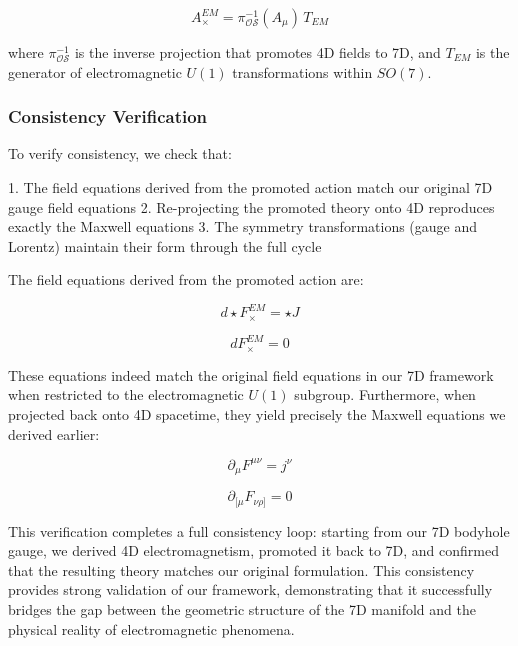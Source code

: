 \documentclass{article}
\begin{document}
\begin{equation}
A^{EM}_{\times} = \pi^{-1}_{\mathcal{OS}}(A_{\mu}) \, T_{EM}
\end{equation}

where $\pi^{-1}_{\mathcal{OS}}$ is the inverse projection that promotes 4D fields to 7D, and $T_{EM}$ is the generator of electromagnetic $U(1)$ transformations within $SO(7)$.

\subsubsection{Consistency Verification}

To verify consistency, we check that:

1. The field equations derived from the promoted action match our original 7D gauge field equations
2. Re-projecting the promoted theory onto 4D reproduces exactly the Maxwell equations
3. The symmetry transformations (gauge and Lorentz) maintain their form through the full cycle

The field equations derived from the promoted action are:

\begin{equation}
d \star F^{EM}_{\times} = \star J
\end{equation}

\begin{equation}
dF^{EM}_{\times} = 0
\end{equation}

These equations indeed match the original field equations in our 7D framework when restricted to the electromagnetic $U(1)$ subgroup. Furthermore, when projected back onto 4D spacetime, they yield precisely the Maxwell equations we derived earlier:

\begin{equation}
\partial_{\mu}F^{\mu\nu} = j^{\nu}
\end{equation}

\begin{equation}
\partial_{[\mu}F_{\nu\rho]} = 0
\end{equation}

This verification completes a full consistency loop: starting from our 7D bodyhole gauge, we derived 4D electromagnetism, promoted it back to 7D, and confirmed that the resulting theory matches our original formulation. This consistency provides strong validation of our framework, demonstrating that it successfully bridges the gap between the geometric structure of the 7D manifold and the physical reality of electromagnetic phenomena.
\end{document}
